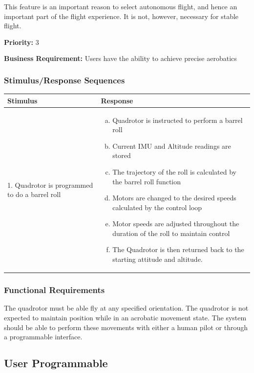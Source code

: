 \documentclass[english]{article}
\numberwithin{equation}{section} %
\begin{document}
This feature is an important reason to select autonomous flight, and hence an important part of the flight experience. It is not, however, necessary for stable flight.

\textbf{Priority:} 3

\textbf{Business Requirement:} Users have the ability to achieve precise aerobatics

\subsubsection{Stimulus/Response Sequences}

\begin{longtable}{p{3cm} | p{8.5cm}}
\hline
\textbf{Stimulus} & \textbf{Response}\\
\hline
1. Quadrotor is programmed to do a barrel roll &
\begin{enumerate}[(a)]\itemsep1pt %
\item Quadrotor is instructed to perform a barrel roll
\item Current IMU and Altitude readings are stored
\item The trajectory of the roll is calculated by the barrel roll function
\item Motors are changed to the desired speeds calculated by the control loop
\item Motor speeds are adjusted throughout the duration of the roll to maintain control
\item The Quadrotor is then returned back to the starting attitude and altitude.
\end{enumerate}
\\ 
\hline
\end{longtable}
\subsubsection{Functional Requirements}
The quadrotor must be able fly at any specified orientation. The quadrotor is not expected to maintain position while in an acrobatic movement state. The system should be able to perform these movements with either a human pilot or through a programmable interface.





\bigskip
\subsection{User Programmable}
\end{document}

